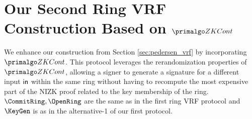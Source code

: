 
\section{Our Second Ring VRF Construction Based on $ \ZKCont $}

\label{subsec:rvrf_faster}
We enhance our construction from Section \ref{sec:pedersen_vrf} by incorporating $ \ZKCont $. This protocol leverages the rerandomization properties of $ \ZKCont $, allowing a signer to generate a signature for a different input $ \mathsf{in} $ within the same ring without having to recompute the most expensive part of the NIZK proof related to the key membership of the ring. $\CommitRing, \OpenRing $ are the same as in the first ring VRF protocol and $ \KeyGen$ is as in the alternative-1 of our first protocol.

